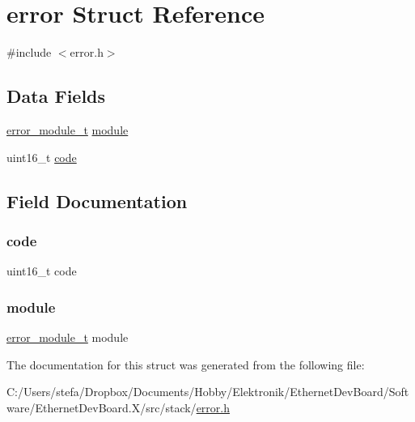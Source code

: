 \hypertarget{structerror}{}\section{error Struct Reference}
\label{structerror}


{\ttfamily \#include $<$error.\+h$>$}

\subsection*{Data Fields}
\begin{DoxyCompactItemize}
\item 
\mbox{\hyperlink{group__error_ga07aaf66e281b4d8635efe00e6402f4a3}{error\+\_\+module\+\_\+t}} \mbox{\hyperlink{structerror_affb043b841035d7a3b692c7fed857471}{module}}
\item 
uint16\+\_\+t \mbox{\hyperlink{structerror_a70008c0b7822b172472813e6730ea565}{code}}
\end{DoxyCompactItemize}


\subsection{Field Documentation}
\mbox{\label{structerror_a70008c0b7822b172472813e6730ea565}} 
\subsubsection{\texorpdfstring{code}{code}}
{\footnotesize\ttfamily uint16\+\_\+t code}

\mbox{\label{structerror_affb043b841035d7a3b692c7fed857471}} 
\subsubsection{\texorpdfstring{module}{module}}
{\footnotesize\ttfamily \mbox{\hyperlink{group__error_ga07aaf66e281b4d8635efe00e6402f4a3}{error\+\_\+module\+\_\+t}} module}



The documentation for this struct was generated from the following file\+:\begin{DoxyCompactItemize}
\item 
C\+:/\+Users/stefa/\+Dropbox/\+Documents/\+Hobby/\+Elektronik/\+Ethernet\+Dev\+Board/\+Software/\+Ethernet\+Dev\+Board.\+X/src/stack/\mbox{\hyperlink{error_8h}{error.\+h}}\end{DoxyCompactItemize}
